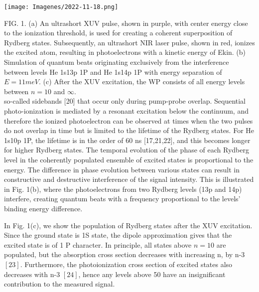 \documentclass[7pt]{article}
\newenvironment{Figura}
{\par\medskip\noindent\minipage{\linewidth}}
  {\endminipage\par\medskip}
\begin{document}
\begin{multicols}{2}
\newpage
\fancyhead[C]{ } 
\fancyfoot[L]{}
\fancyfoot[R]{ }
    \begin{Figura}
        \centering
        \texttt{[image: Imagenes/2022-11-18.png]}
    \end{Figura}
FIG. 1. (a) An ultrashort XUV pulse, shown in purple, with center energy close to the ionization threshold, is used for creating a coherent superposition of Rydberg states. Subsequently, an ultrashort NIR laser pulse, shown in red, ionizes the excited atom, resulting in photoelectrons with a kinetic energy of Ekin. (b) Simulation of quantum beats originating exclusively from the interference between levels He 1s13p 1P and He 1s14p 1P with energy separation of $E = 11 meV$. (c) After the XUV excitation, the WP consists of all energy levels between $n = 10$ and $\infty$.\\

so-called sidebands [20] that occur only during pump-probe overlap. Sequential photo-ionization is mediated by a resonant excitation below the continuum, and therefore the ionized photoelectron can be observed at times when the two pulses do not overlap in time but is limited to the lifetime of the Rydberg states. For He 1s10p 1P, the lifetime is in the order of 60 ns [17,21,22], and this becomes longer for higher Rydberg states. The temporal evolution of the phase of each Rydberg level in the coherently populated ensemble of excited states is proportional to the energy. The difference in phase evolution between various states can result in constructive and destructive interference of the signal intensity. This is illustrated in Fig. 1(b), where the photoelectrons from two Rydberg levels (13p and 14p) interfere, creating quantum beats with a frequency proportional to the levels’ binding energy difference.


In Fig. 1(c), we show the population of Rydberg states after the XUV excitation. Since the ground state is 1S state, the dipole approximation gives that the excited state is of 1 P character. In principle, all states above $n = 10$ are populated, but the absorption cross section decreases with increasing n, by n-3 $[23]$. Furthermore, the photoionization cross section of excited states also decreases with n-3 $[24]$, hence any levels above 50 have an insignificant contribution to the measured signal.


\end{multicols}
\end{document}
